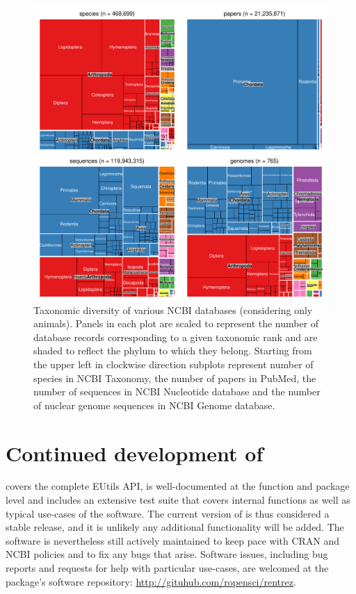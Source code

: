 \begin{figure}
\begin{center}
\includegraphics{Fig1}
\caption{Taxonomic diversity of various NCBI databases (considering only
animals). Panels in each plot are scaled to represent the number of database
records corresponding to a given taxonomic rank and are shaded to reflect the
phylum to which they belong. Starting from the upper left in clockwise direction
subplots represent number of species in NCBI Taxonomy, the number of papers 
in PubMed, the number of sequences in NCBI Nucleotide database and the number of 
nuclear genome sequences in NCBI Genome database.}
\label{fig:tm}
\end{center}
\end{figure}

\section{Continued development of }

 covers the complete EUtils API, is well-documented at the function
and package level and includes an extensive test suite that covers
internal functions as well as typical use-cases of the software. The current
version of  is thus considered a stable release, and it is
unlikely any additional functionality will be added. The software is nevertheless
still actively maintained to keep pace with CRAN and NCBI policies and to fix
any bugs that arise. Software issues, including bug reports and requests for help 
with particular use-cases, are welcomed at the package's software repository:
\url{http://gituhub.com/ropensci/rentrez}.

